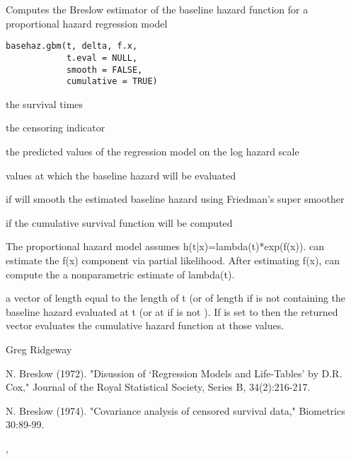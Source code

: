 \documentclass{article}
\begin{document}
\begin{Description}\relax
Computes the Breslow estimator of the baseline hazard function for a proportional hazard regression model
\end{Description}
\begin{Usage}
\begin{verbatim}
basehaz.gbm(t, delta, f.x, 
            t.eval = NULL, 
            smooth = FALSE, 
            cumulative = TRUE)
\end{verbatim}
\end{Usage}
\begin{Arguments}
\begin{ldescription}
\item[\code{t}] the survival times 
\item[\code{delta}] the censoring indicator 
\item[\code{f.x}] the predicted values of the regression model on the log hazard scale 
\item[\code{t.eval}] values at which the baseline hazard will be evaluated 
\item[\code{smooth}] if   will smooth the estimated baseline hazard using Friedman's super smoother 
\item[\code{cumulative}] if  the cumulative survival function will be computed 
\end{ldescription}
\end{Arguments}
\begin{Details}\relax
The proportional hazard model assumes h(t|x)=lambda(t)*exp(f(x)).  can estimate the f(x) component via partial likelihood. After estimating f(x),  can compute the a nonparametric estimate of lambda(t).
\end{Details}
\begin{Value}
a vector of length equal to the length of t (or of length  if  is not  containing the baseline hazard evaluated at t (or at  if  is not ). If  is set to  then the returned vector evaluates the cumulative hazard function at those values.
\end{Value}
\begin{Author}\relax
Greg Ridgeway 
\end{Author}
\begin{References}\relax
N. Breslow (1972). "Disussion of `Regression Models and Life-Tables' by D.R. Cox," Journal of the Royal Statistical Society, Series B, 34(2):216-217.

N. Breslow (1974). "Covariance analysis of censored survival data," Biometrics 30:89-99.
\end{References}
\begin{SeeAlso}\relax
{}, 
\end{SeeAlso}
\end{document}
